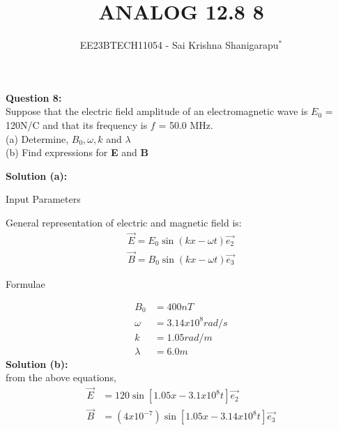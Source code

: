 \documentclass[journal,12pt,twocolumn]{IEEEtran}
\theoremstyle{remark}
\begin{document}

\vspace{3cm}

\title{ANALOG 12.8 8}
\author{EE23BTECH11054 - Sai Krishna Shanigarapu$^{*}$%
}
\maketitle
\newpage
\bigskip

\begin{flushleft}
\textbf{Question 8:}\\
Suppose that the electric field amplitude of an electromagnetic wave is $E_0$ = 120N/C and that its frequency is $f$ = 50.0 MHz.\\
(a) Determine, $B_0, \omega, k$ and $\lambda$\\
(b) Find expressions for \textbf{E} and \textbf{B}\\
\end{flushleft}

\bigskip

\begin{flushleft}
\textbf{Solution (a):}\\
\end{flushleft}

\begin{center}
    \begin{table}[h]
        \caption{Input Parameters}
        
        \label{tab:table1.12.8.8}
    \end{table}
\end{center}

\begin{flushleft}
   General representation of electric and magnetic field is:\\
   \begin{align}
   \vec{E} = E_0\sin(kx - \omega t)\vec{e_2}\\
   \vec{B} = B_0\sin(kx - \omega t)\vec{e_3}
   \end{align}

\begin{center}
    \begin{table}[ht]
       \caption{Formulae}
       
       \label{tab:table3.12.8.8}
    \end{table}
\end{center}
    

\newpage

\begin{align}
    B_0  &= 400nT\\
    \omega &= 3.14 x 10^8 rad/s\\
    k &= 1.05 rad/m\\
    \lambda &=  6.0m    
\end{align}
    \textbf{Solution (b):}\\
    \bigskip
    from the above equations, \\
    \begin{align}
    \vec{E} &= 120 \sin[1.05x - 3.1 x 10^8t]\vec{e_2}\\
    \vec{B} &= (4 x 10^{-7})\sin[1.05x - 3.14 x 10^8t]\vec{e_3}
    \end{align} 
\end{flushleft}
\end{document}
